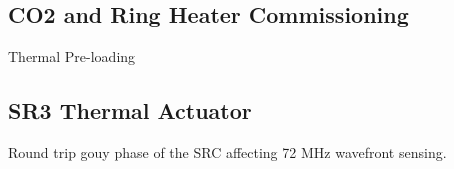 	\cite{AWC_current}
	
	\cite{Brooks_OffAxis}
	
	\cite{Veitch_HWS_ALIGO}
	
	\cite{Brooks_HWS}
	
	\subsection{CO2 and Ring Heater Commissioning}
	Thermal Pre-loading
	
	\cite{hello_vinet}
	
	\cite{ramette_analytical}
	
	\cite{wang_thermalmodel}
	
	\cite{winkler_thermaldist}
	
	
	\subsection{SR3 Thermal Actuator}
	Round trip gouy phase of the SRC affecting 72 MHz wavefront sensing.
